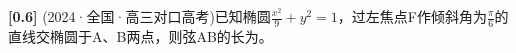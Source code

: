 \documentclass[varwidth=16cm, border=2mm]{standalone}
\begin{document}
\textbf{[0.6]} (2024·全国·高三对口高考)已知椭圆$\frac{x^2}{9} + y^2 = 1$，过左焦点F作倾斜角为$\frac{\pi}{6}$的直线交椭圆于A、B两点，则弦AB的长为\underline{\hspace{1.5cm}}。
\end{document}
